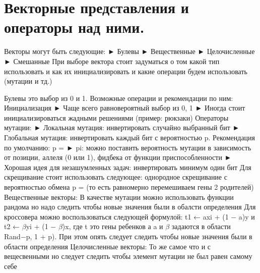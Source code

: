 \section{Векторные представления и операторы над ними.}
Векторы могут быть следующие: 
► Булевы
► Вещественные
► Целочисленные
► Смешанные
При выборе вектора стоит задуматься о том какой тип использовать и как их инициализировать и какие операции будем использовать (мутации и тд.)

Булевы это выбор из 0 и 1. 
Возможные операции и рекомендации по ним:
Инициализация
► Чаще всего равновероятный выбор из {0, 1}
► Иногда стоит инициализироваться жадными решениями (пример: рюкзаки)
Операторы мутации:
► Локальная мутация: инвертировать случайно выбранный бит
► Глобальная мутация: инвертировать каждый бит с вероятностью p. Рекомендация по умолчанию: p = 
► pi: можно поставить вероятность мутации в зависимость от позиции, аллеля (0 или 1), фидбека от функции приспособленности
► Хорошая идея для незашумленных задач: инвертировать минимум один бит
Для скрещивание стоит использовать следующее: однородное скрещивание с вероятностью обмена p =  (то есть равномерно перемешиваем гены 2 родителей)
Вещественные векторы:
В качестве мутации можно использовать функции рандома но надо следить чтобы новые значения были в обалсти определения
Для кроссовера можно воспользоваться следующей формулой: t1 ← axi + (1 − a)y и t2 ← $\beta$yi + (1 − $\beta$)x, где t это гены ребенков а a и $\beta$ задаются в области Rand−p, 1 + p). При этом опять следует следить чтобы новые значения были в области определения
Целочисленные векторы:
То же самое что и с вещесвенными но следует следить чтобы элемент мутации не был равен самому себе
